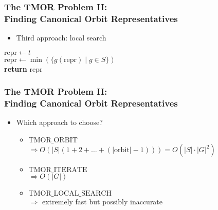 \documentclass{beamer}
\begin{document}
\begin{frame}
  \frametitle{The TMOR Problem II:\\Finding Canonical Orbit Representatives}

  \begin{itemize}
    \item Third approach: local search
  \end{itemize}

  \vspace{.25cm}

  \begin{algorithmic}[1]
    \State $\mathrm{repr} \gets t$
    \\
      \State $\mathrm{repr} \gets \min(\{g(\mathrm{repr}) \mid g \in S\})$
    \EndWhile
    \\
    \State \textbf{return} $\mathrm{repr}$
  \EndProcedure
  \end{algorithmic}
\end{frame}

\begin{frame}
  \frametitle{The TMOR Problem II:\\Finding Canonical Orbit Representatives}

  \begin{itemize}
    \setlength\itemsep{.25cm}

    \item<1-> Which approach to choose?
      \begin{itemize}
        \setlength\itemsep{.25cm}

        \item<2-> $\mathrm{TMOR\_ORBIT}$\\
              $\Rightarrow O(|S| (1 + 2 + \dots + (|\mathrm{orbit}| - 1))) =
               O(|S| \cdot |G|^2)$
        \item<3-> $\mathrm{TMOR\_ITERATE}$\\
              $\Rightarrow O(|G|)$
        \item<4-> $\mathrm{TMOR\_LOCAL\_SEARCH}$\\
              $\Rightarrow$ extremely fast but possibly inaccurate
      \end{itemize}
  \end{itemize}
\end{frame}
\end{document}
